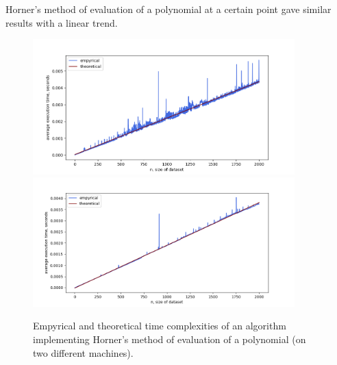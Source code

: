\documentclass[12pt, a4paper]{article}
\begin{document}
Horner's method of evaluation of a polynomial at a certain point gave similar results with a linear trend.
\begin{figure}[!h]
\centering
\includegraphics[width=0.9\textwidth]{polyhorner.png}
\includegraphics[width=0.9\textwidth]{valeria/polyhorner.png}
\caption{Empyrical and theoretical time complexities of an algorithm implementing Horner's method of evaluation of a polynomial (on two different machines).}
\end{figure}

\newpage
\end{document}
